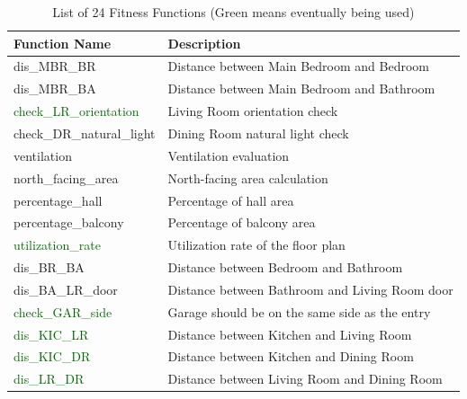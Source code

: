 \documentclass[]{article}
\begin{document}
\begin{table}[h]
    \centering
    \caption{List of 24 Fitness Functions (Green means eventually being used)}
    \label{tab:fitness_functions}
    \begin{tabularx}{\textwidth}{l l}
        \hline
        \textbf{Function Name}                         & \textbf{Description}                           \\
        \hline
        dis\_MBR\_BR                                   & Distance between Main Bedroom and Bedroom      \\
        dis\_MBR\_BA                                   & Distance between Main Bedroom and Bathroom     \\
        \textcolor{darkgreen}{check\_LR\_orientation}  & Living Room orientation check                  \\
        check\_DR\_natural\_light                      & Dining Room natural light check                \\
        ventilation                                    & Ventilation evaluation                         \\
        north\_facing\_area                            & North-facing area calculation                  \\
        percentage\_hall                               & Percentage of hall area                        \\
        percentage\_balcony                            & Percentage of balcony area                     \\
        \textcolor{darkgreen}{utilization\_rate }      & Utilization rate of the floor plan             \\
        dis\_BR\_BA                                    & Distance between Bedroom and Bathroom          \\
        dis\_BA\_LR\_door                              & Distance between Bathroom and Living Room door \\
        \textcolor{darkgreen}{check\_GAR\_side}        & Garage should be on the same side as the entry \\
        \textcolor{darkgreen}{dis\_KIC\_LR}            & Distance between Kitchen and Living Room       \\
        \textcolor{darkgreen}{dis\_KIC\_DR}            & Distance between Kitchen and Dining Room       \\
        \textcolor{darkgreen}{dis\_LR\_DR}             & Distance between Living Room and Dining Room   \\

\end{tabularx}
\end{table}
\end{document}
